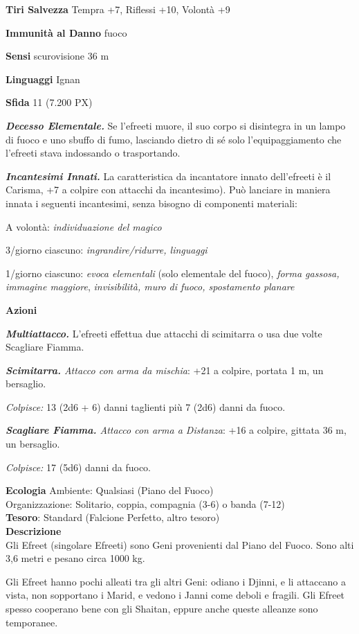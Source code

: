 \begin{multicols}{2}
	\textbf{Tiri Salvezza} Tempra +7, Riflessi +10, Volontà +9

	\textbf{Immunità al Danno} fuoco

	\textbf{Sensi} scurovisione 36 m

	\textbf{Linguaggi} Ignan

	\textbf{Sfida} 11 (7.200 PX)

	\textit{\textbf{Decesso Elementale.}} Se l'efreeti muore, il suo corpo si disintegra in un lampo di fuoco e uno sbuffo di fumo, lasciando dietro di sé solo l'equipaggiamento che l'efreeti stava indossando o trasportando.

	\textit{\textbf{Incantesimi Innati.}} La caratteristica da incantatore innato dell'efreeti è il Carisma, +7 a colpire con attacchi da incantesimo). Può lanciare in maniera innata i seguenti incantesimi, senza bisogno di componenti materiali:

	A volontà: \textit{individuazione del magico}

	3/giorno ciascuno: \textit{ingrandire/ridurre, linguaggi}

	1/giorno ciascuno: \textit{evoca elementali} (solo elementale del fuoco), \textit{forma gassosa, immagine maggiore}, \textit{invisibilità, muro di fuoco, spostamento planare}

	\textbf{Azioni}

	\textit{\textbf{Multiattacco.}} L'efreeti effettua due attacchi di scimitarra o usa due volte Scagliare Fiamma.

	\textit{\textbf{Scimitarra.} Attacco con arma da mischia}: +21 a colpire, portata 1 m, un bersaglio.

	\textit{Colpisce:} 13 (2d6 + 6) danni taglienti più 7 (2d6) danni da fuoco.

	\textit{\textbf{Scagliare Fiamma.} Attacco con arma a Distanza}: +16 a colpire, gittata 36 m, un bersaglio.

	\textit{Colpisce:} 17 (5d6) danni da fuoco.

	\textbf{Ecologia}
	Ambiente: Qualsiasi (Piano del Fuoco)\\
	Organizzazione: Solitario, coppia, compagnia (3-6) o banda (7-12)\\
	\textbf{Tesoro}: Standard (Falcione Perfetto, altro tesoro)\\
	\textbf{Descrizione}\\
	Gli Efreet (singolare Efreeti) sono Geni provenienti dal Piano del Fuoco. Sono alti 3,6 metri e pesano circa 1000 kg.

	Gli Efreet hanno pochi alleati tra gli altri Geni: odiano i Djinni, e li attaccano a vista, non sopportano i Marid, e vedono i Janni come deboli e fragili. Gli Efreet spesso cooperano bene con gli Shaitan, eppure anche queste alleanze sono temporanee.



\end{multicols}
